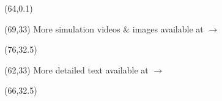 \documentclass[landscape]{a0poster}
\begin{document}
\begin{textblock}{6}(64,0.1) %
\end{textblock} %



\begin{textblock}{6.5}(69,33) %
	\Large	More simulation videos \& images available at $\rightarrow$
\end{textblock} %

\begin{textblock}{2}(76,32.5) %
\end{textblock} %

\begin{textblock}{3}(62,33) %
\Large	More detailed text available at $\rightarrow$
\end{textblock} %

\begin{textblock}{2}(66,32.5) %
\end{textblock} %
\end{document}

